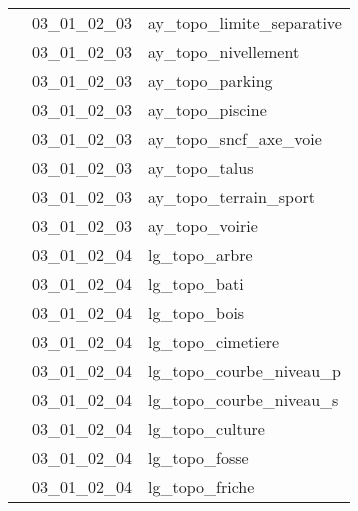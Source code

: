 \documentclass[12pt,titlepage]{book}
\begin{document}
\begin{supertabular}{|p{10cm}|c|p{15cm}|}
                    & 03\_01\_02\_03 & ay\_topo\_limite\_separative\\


                    & 03\_01\_02\_03 & ay\_topo\_nivellement\\


                    & 03\_01\_02\_03 & ay\_topo\_parking\\


                    & 03\_01\_02\_03 & ay\_topo\_piscine\\


                    & 03\_01\_02\_03 & ay\_topo\_sncf\_axe\_voie\\


                    & 03\_01\_02\_03 & ay\_topo\_talus\\


                    & 03\_01\_02\_03 & ay\_topo\_terrain\_sport\\


                    & 03\_01\_02\_03 & ay\_topo\_voirie\\


                    & 03\_01\_02\_04 & lg\_topo\_arbre\\


                    & 03\_01\_02\_04 & lg\_topo\_bati\\


                    & 03\_01\_02\_04 & lg\_topo\_bois\\


                    & 03\_01\_02\_04 & lg\_topo\_cimetiere\\


                    & 03\_01\_02\_04 & lg\_topo\_courbe\_niveau\_p\\


                    & 03\_01\_02\_04 & lg\_topo\_courbe\_niveau\_s\\


                    & 03\_01\_02\_04 & lg\_topo\_culture\\


                    & 03\_01\_02\_04 & lg\_topo\_fosse\\


                    & 03\_01\_02\_04 & lg\_topo\_friche\\



\end{supertabular}
\end{document}
